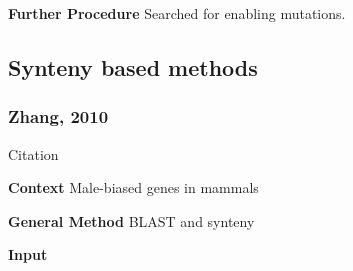 \textbf{Further Procedure} Searched for enabling mutations.

\subsection{Synteny based methods}

\subsubsection{Zhang, 2010}

Citation \cite{zhang_chromosomal_2010}

\textbf{Context} Male-biased genes in mammals

\textbf{General Method} BLAST and synteny

\textbf{Input} 
